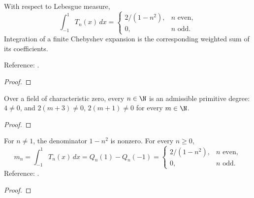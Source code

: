 \begin{theorem}
\label{thm:T-unweighted-moments}
\leanok
With respect to Lebesgue measure,
\[
 \int_{-1}^1T_n(x)\,dx=\begin{cases}2/(1-n^2),&n\text{ even},\\0,&n\text{ odd}.\end{cases}
\]
Integration of a finite Chebyshev expansion is the corresponding weighted sum
of its coefficients.

Reference: \cite[equation (19.6) and Theorem 19.2]{atap}.
\end{theorem}
\begin{proof}
\leanok
\end{proof}

\begin{supporting}

\begin{theorem}
\label{thm:T-primitive-input}
\leanok
Over a field of characteristic zero, every $n\in\N$ is an admissible
primitive degree: $4\ne0$, and $2(m+3)\ne0$, $2(m+1)\ne0$ for every $m\in\N$.
\end{theorem}
\begin{proof}
\leanok
\end{proof}

\begin{theorem}
\label{thm:integral-moment}
\leanok
For $n\ne1$, the denominator $1-n^2$ is nonzero. For every $n\ge0$,
\[
 m_n=\int_{-1}^1T_n(x)\,dx
 =Q_n(1)-Q_n(-1)
 =\begin{cases}2/(1-n^2),&n\text{ even},\\0,&n\text{ odd}.\end{cases}
\]
Reference: \cite[equation (19.6)]{atap}.
\end{theorem}
\begin{proof}
\leanok
\end{proof}

\end{supporting}

